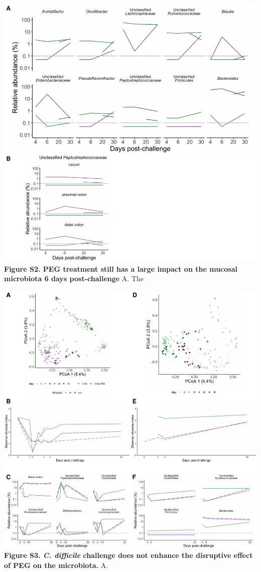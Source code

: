 \documentclass[
  11pt,
]{article}
\begin{document}
\includegraphics{figure_S2.pdf} \textbf{Figure S2. PEG treatment still
has a large impact on the mucosal microbiota 6 days post-challenge} A.
The\\
\newpage

\includegraphics{figure_S3.pdf} \textbf{Figure S3. \emph{C. difficile}
challenge does not enhance the disruptive effect of PEG on the
microbiota.} A. \newpage
\end{document}
